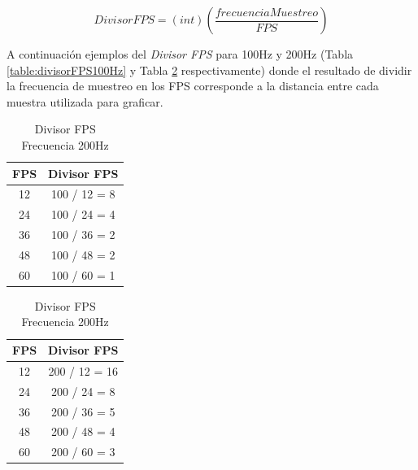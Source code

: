 \documentclass[12pt,a4paper]{article}
\begin{document}
\begin{equation}
\label{eq:divisorFPS}
DivisorFPS=(int)\left(\frac{frecuenciaMuestreo}{FPS}\right)
\end{equation}

A continuación ejemplos del \textit{Divisor FPS} para 100Hz y 200Hz (Tabla \ref{table:divisorFPS100Hz} y Tabla \ref{table:divisorFPS200Hz} respectivamente) donde el resultado de dividir la frecuencia de muestreo en los FPS corresponde a la distancia entre cada muestra utilizada para graficar.

\begin{table}[!htb]
	\begin{minipage}{.5\linewidth}
		\centering
			\begin{tabular}{|c|c|}
				\hline
				\textbf{FPS} & \multicolumn{1}{l|}{\textbf{Divisor FPS}} \\ \hline
				12           & 100 / 12 = 8                                         \\ \hline
				24           & 100 / 24 = 4                                         \\ \hline
				36           & 100 / 36 = 2                                         \\ \hline
				48           & 100 / 48 = 2                                         \\ \hline
				60           & 100 / 60 = 1                                         \\ \hline
			\end{tabular}
			\caption{Divisor FPS Frecuencia 100Hz}
			\label{table:divisorFPS100Hz}
	\end{minipage}%
	\begin{minipage}{.5\linewidth}
		\centering
		\begin{tabular}{|c|c|}
			\hline
			\textbf{FPS} & \multicolumn{1}{l|}{\textbf{Divisor FPS}} \\ \hline
				12           & 200 / 12 = 16                             \\ \hline
				24           & 200 / 24 = 8                              \\ \hline
				36           & 200 / 36 = 5                              \\ \hline
				48           & 200 / 48 = 4                              \\ \hline
				60           & 200 / 60 = 3                              \\ \hline
		\end{tabular}
		\caption{Divisor FPS Frecuencia 200Hz}
		\label{table:divisorFPS200Hz}
	\end{minipage}
\end{table}
\end{document}
